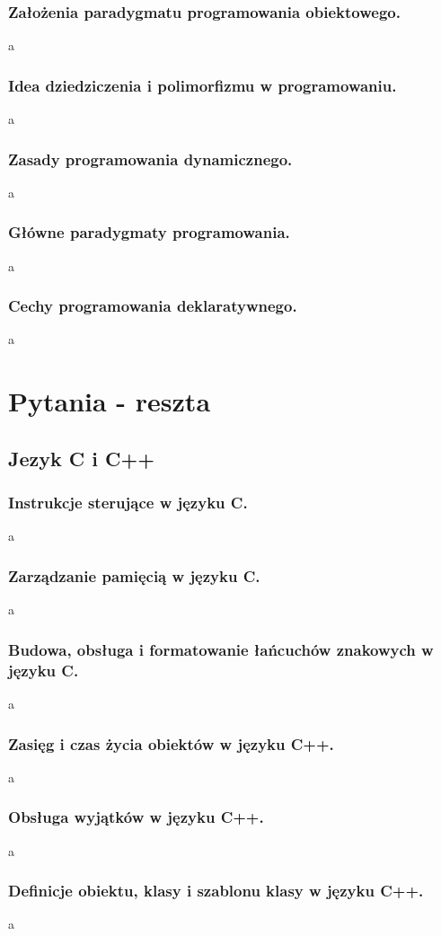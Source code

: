 \documentclass[a4paper,12pt,oneside]{book}
\begin{document}
			\subsection{\color{red}Założenia paradygmatu programowania obiektowego.}
				a
			\newpage\subsection{\color{red}Idea dziedziczenia i polimorfizmu w programowaniu.}
				a
			\newpage\subsection{\color{red}Zasady programowania dynamicznego.}
				a
			\newpage\subsection{\color{red}Główne paradygmaty programowania.}
				a
			\newpage\subsection{\color{red}Cechy programowania deklaratywnego.}
				a
	
	\chapter{Pytania - reszta}
	
		\section{Jezyk C i C++}
			\subsection{\color{red}Instrukcje sterujące w języku C.}
				a
			\newpage\subsection{\color{red}Zarządzanie pamięcią w języku C.}
				a
			\newpage\subsection{\color{red}Budowa, obsługa i formatowanie łańcuchów znakowych w języku C.}
				a
			\newpage\subsection{\color{red}Zasięg i czas życia obiektów w języku C++.}
				a
			\newpage\subsection{\color{red}Obsługa wyjątków w języku C++.}
				a
			\newpage\subsection{\color{red}Definicje obiektu, klasy i szablonu klasy w języku C++.}
				a
		
\end{document}
